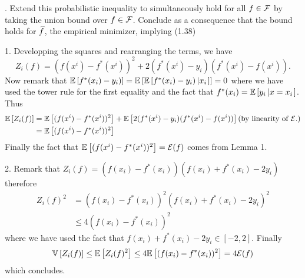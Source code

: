 . Extend this probabilistic inequality to simultaneously hold for all $f \in \mathcal{F}$ by taking the 
union bound over $f \in \mathcal{F}$. Conclude as a consequence that the bound holds for $\widehat f$, the empirical minimizer, implying (1.38)
\begin{solution}[]
1. Developping the squares and rearranging the terms, we have
   \[Z_i(f) = (f(x^i)-f^*(x^i))^2 +2(f^*(x^i)-y_i)(f^*(x^i)-f(x^i)).\] 
 Now remark that $\mathbb{E}\left[f^*(x_i)-y_i)\right]= \mathbb{E}\left[\mathbb{E}\left[f^*(x_i)-y_i)\left|x_i\right.\right]\right] = 0$ 
 where we have used the tower rule for the first equality and the fact that $f^*(x_i)=\mathbb{E}\left[y_i\left|x=x_i\right.\right]$.
Thus
\begin{align*}
    \mathbb{E}\left[Z_i(f)\right] &= \mathbb{E}\left[(f(x^i)-f^*(x^i))^2\right] + \mathbb{E}\left[2(f^*(x^i)-y_i)(f^*(x^i)-f(x^i))\right] \text{(by linearity of $\mathcal{E}{.}$)} \\
                &= \mathbb{E}\left[(f(x^i)-f^*(x^i))^2\right]
\end{align*}
Finally the fact that $\mathbb{E}\left[(f(x^i)-f^*(x^i))^2\right]= \mathcal{E}(f)$ comes from Lemma 1.

2. Remark that $Z_i(f) = (f(x_i)-f^*(x_i))(f(x_i)+f^*(x_i)-2y_i)$ therefore
\begin{align*}
    Z_i(f)^2 &=  (f(x_i)-f^*(x_i))^2(f(x_i)+f^*(x_i)-2y_i)^2\\
    &\leq 4(f(x_i)-f^*(x_i))^2
\end{align*}
where we have used the fact that $f(x_i)+f^*(x_i)-2y_i \in [-2,2].$
Finally
\[ \mathbb{V}\left[Z_i(f)\right] \leq \mathbb{E}\left[Z_i(f)^2\right] \leq 4 \mathbb{E}\left[(f(x_i)-f^*(x_i))^2\right] = 4\mathcal{E}(f)\]
which concludes.


\end{solution}

